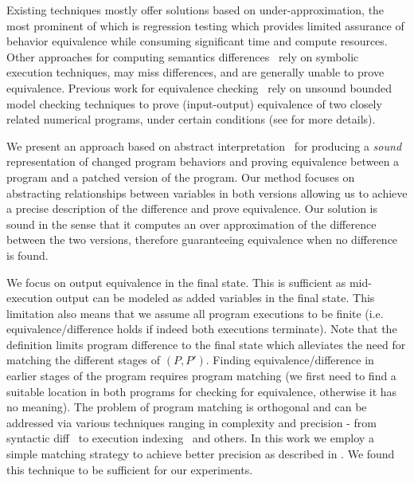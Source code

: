 Existing techniques mostly offer solutions based on  under-approximation, the most prominent of which is regression testing which provides limited assurance of behavior equivalence while consuming significant time and compute resources. 
Other approaches for computing semantics differences~\cite{DwyerElbaumPerson08,EnglerRamos11} rely on symbolic execution techniques, may miss differences, and are generally unable to prove equivalence. Previous work for equivalence checking~\cite{GodlinStrichman09} rely on unsound bounded model checking techniques to prove (input-output) equivalence of two closely related numerical programs, under certain conditions (see  for more details).

We present an approach based on abstract interpretation~\cite{CousotCousot77} for producing a \emph{sound} representation of changed program behaviors and proving equivalence between a program and a patched version of the program. Our method focuses on abstracting relationships between variables in both versions allowing us to achieve a precise description of the difference and prove equivalence. Our solution is sound in the sense that it computes an over approximation of the difference between the two versions, therefore guaranteeing equivalence when no difference is found.

We focus on output equivalence in the final state. This is sufficient as mid-execution output can be modeled as added variables in the final state. This limitation also means that we assume all program executions to be finite (i.e. equivalence/difference holds if indeed both executions terminate). Note that the definition limits program difference to the final state which alleviates the need for matching the different stages of $(P,P')$. Finding equivalence/difference in earlier stages of the program requires program matching (we first need to find a suitable location in both programs for checking for equivalence, otherwise it has no meaning). The problem of program matching is orthogonal and can be addressed via various techniques ranging in complexity and precision - from syntactic diff~\cite{HuntMcIlroy75} to execution indexing~\cite{Xin:2008} and others. In this work we employ a simple matching strategy to achieve better precision as described in . We found this technique to be sufficient for our experiments.

